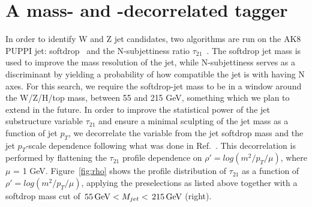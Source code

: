 \section{A mass- and \PT-decorrelated tagger}
\label{sec:searchIII:ddt}
In order to identify W and Z jet candidates, two algorithms are run on the AK8 PUPPI jet: softdrop~\cite{softdrop} and the N-subjettiness ratio $\tau_{21}$~\cite{nsubjettiness}.
The softdrop jet mass is used to improve the mass resolution of the jet, while N-subjettiness serves as a discriminant by yielding a probability of how compatible the jet is with having N axes. For this search, we require the softdrop-jet mass to be in a window around the W/Z/H/top mass, between 55 and 215 GeV, something which we plan to extend in the future. In order to improve the statistical power of the jet substructure variable $\tau_{21}$ and ensure a minimal sculpting of the jet mass as a function of jet $p_T$,
we decorrelate the variable from the jet softdrop mass and the jet $p_T$-scale dependence following what was done in Ref.~\cite{ddt}.
This decorrelation is performed by flattening the $\tau_{21}$ profile dependence on $\rho' = log(m^2/p_T/\mu)$, where $\mu$ = 1 GeV.
Figure~\ref{fig:rho} shows the profile distribution of $\tau_{21}$ as a function of $\rho' = log(m^2/p_T/\mu)$, applying the preselections as listed above together with a softdrop mass cut of $\text{\,55}{\ensuremath{\,\text{Ge\hspace{-.08em}V}}} < M_{jet} < \text{\,215}{\ensuremath{\,\text{Ge\hspace{-.08em}V}}}$ (right).
